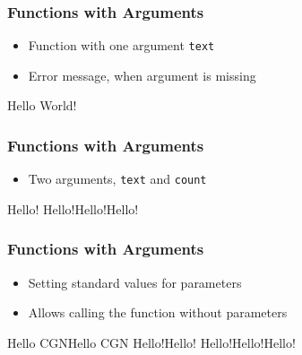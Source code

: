 \documentclass[english]{beamer}
\newcommand{\ta}[1]{\textattachfile[color=1 0 0]{#1}{Code}}
\begin{document}
\begin{frame}[containsverbatim]
\frametitle{Functions with Arguments}

\begin{itemize}
	\item Function with one argument \texttt{text} 
	\item Error message, when argument is missing
\end{itemize}



\begin{ausgabe}
Hello World!
\end{ausgabe}

\end{frame}



\begin{frame}[containsverbatim]
\frametitle{Functions with Arguments}

\begin{itemize}
	\item Two arguments, \texttt{text} and \texttt{count}
\end{itemize}



\begin{ausgabe}

Hello!
Hello!Hello!Hello!

\end{ausgabe}

\end{frame}

\begin{frame}[containsverbatim]
\frametitle{Functions with Arguments}

\begin{itemize}
	\item Setting standard values for parameters
	\item Allows calling the function without parameters
\end{itemize}



\begin{ausgabe}
Hello CGNHello CGN
Hello!Hello!
Hello!Hello!Hello!
\end{ausgabe}

\end{frame}
\end{document}
